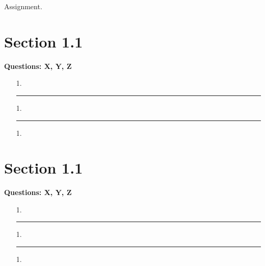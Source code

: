 \documentclass[11pt]{article}
\begin{document}
\begin{flushleft}
Assignment.

\section*{Section 1.1}
\textbf{Questions: X, Y, Z}
\begin{enumerate}
\itemsep1em

\item[1.]
\rule[0.1pt]{40em}{1.0pt}

\item[1.]
\rule[0.1pt]{40em}{1.0pt}

\item[1.]

\end{enumerate}

\section*{Section 1.1}
\textbf{Questions: X, Y, Z}
\begin{enumerate}
\itemsep1em

\item[1.]
\rule[0.1pt]{40em}{1.0pt}

\item[1.]
\rule[0.1pt]{40em}{1.0pt}

\item[1.]

\end{enumerate}


\end{flushleft}
\end{document}
